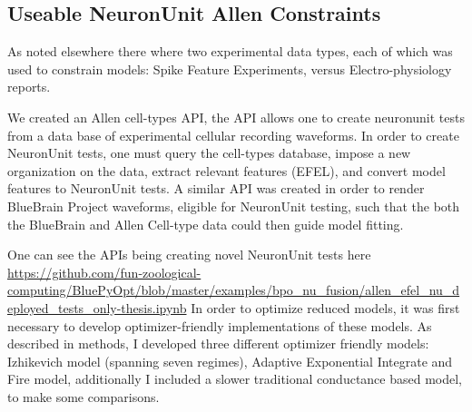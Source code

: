 






\subsection{Useable NeuronUnit Allen Constraints}

As noted elsewhere there where two experimental data types, each of which was used to constrain models: Spike Feature Experiments, versus Electro-physiology reports.

We created an Allen cell-types API, the API allows one to create neuronunit tests from a data base of experimental cellular recording waveforms. In order to create NeuronUnit tests, one must query the cell-types database, impose a new organization on the data, extract relevant features (EFEL), and convert model features to NeuronUnit tests. A similar API was created in order to render BlueBrain Project waveforms, eligible for NeuronUnit testing, such that the both the BlueBrain \cite{toledo} and Allen Cell-type data could then guide model fitting. %


One can see the APIs being creating novel NeuronUnit tests here \url{https://github.com/fun-zoological-computing/BluePyOpt/blob/master/examples/bpo_nu_fusion/allen_efel_nu_deployed_tests_only-thesis.ipynb}
In order to optimize reduced models, it was first necessary to develop optimizer-friendly implementations of these models. As described in methods, I developed three different optimizer friendly models: Izhikevich model (spanning seven regimes), Adaptive Exponential Integrate and Fire model, additionally I included a slower traditional conductance based model, to make some comparisons.

